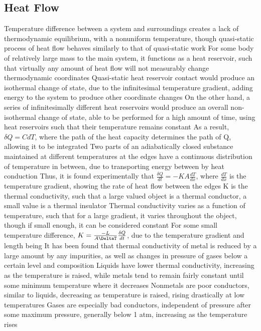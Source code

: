 \subsection{Heat Flow}
\begin{outline*}
\1 Temperature difference between a system and surroundings creates a lack of thermodynamic equilibrium, with a nonuniform temperature, though quasi-static process of heat flow behaves similarly to that of quasi-static work
\2 For some body of relatively large mass to the main system, it functions as a heat reservoir, such that virtually any amount of heat flow will not measurably change thermodynamic coordinates
\2 Quasi-static heat reservoir contact would produce an isothermal change of state, due to the infinitesimal temperature gradient, adding energy to the system to produce other coordinate changes
\3 On the other hand, a series of infinitesimally different heat reservoirs would produce an overall non-isothermal change of state, able to be performed for a high amount of time, using heat reservoirs such that their temperature remains constant
\3 As a result, $\delta Q = CdT$, where the path of the heat capacity determines the path of Q, allowing it to be integrated
\1 Two parts of an adiabatically closed substance maintained at different temperatures at the edges have a continuous distribution of temperature in between, due to transporting energy between by heat conduction
\2 Thus, it is found experimentally that $\frac{\delta Q}{dt} = -KA\frac{dT}{dx}$, where $\frac{dT}{dx}$ is the temperature gradient, showing the rate of heat flow between the edges
\3 K is the thermal conductivity, such that a large valued object is a thermal conductor, a small value is a thermal insulator
\2 Thermal conductivity varies as a function of temperature, such that for a large gradient, it varies throughout the object, though if small enough, it can be considered constant
\3 For some small temperature difference, $K = \frac{-L}{A\DeltaT}\frac{\delta Q}{dt}$, due to the temperature gradient and length being
\2 It has been found that thermal conductivity of metal is reduced by a large amount by any impurities, as well as changes in pressure of gases below a certain level and composition
\3 Liquids have lower thermal conductivity, increasing as the temperature is raised, while metals tend to remain fairly constant until some minimum temperature where it decreases
\3 Nonmetals are poor conductors, similar to liquids, decreasing as temperature is raised, rising drastically at low temperatures
\3 Gases are especially bad conductors, independent of pressure after some maximum pressure, generally below 1 atm, increasing as the temperature rises

\end{outline*}
